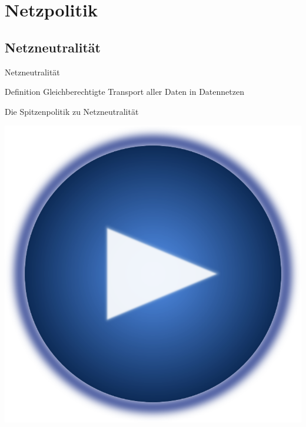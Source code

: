 \documentclass{beamer}
\begin{document}
\section{Netzpolitik}
\subsection{Netzneutralität}
\begin{frame}{Netzneutralität}
\begin{block}{Definition}
	Gleichberechtigte Transport aller Daten in Datennetzen
\end{block}
\end{frame}

\begin{frame}{Die Spitzenpolitik zu Netzneutralität}
\begin{center}
\href{./oettinger.mp4}{
	\centering
	\includegraphics[scale=0.15]{pics/Play-button.png}
}
\end{center}
\end{frame}
\end{document}
